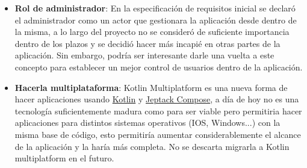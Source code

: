 \begin{itemize}
    \item \textbf{Rol de administrador}: En la especificación de requisitos inicial se declaró el administrador como un actor que gestionara la aplicación desde dentro de la misma, a lo largo del proyecto no se consideró de suficiente importancia dentro de los plazos y se decidió hacer más incapié en otras partes de la aplicación. Sin embargo, podría ser interesante darle una vuelta a este concepto para establecer un mejor control de usuarios dentro de la aplicación.
    \item \textbf{Hacerla multiplataforma}: Kotlin Multiplatform\hyperlink{cap:biblio}{} es una nueva forma de hacer aplicaciones usando \hyperlink{subsec:kotlin}{Kotlin} y \hyperlink{subsec:compose}{Jeptack Compose}, a día de hoy no es una tecnología suficientemente madura como para ser viable pero permitiria hacer aplicaciones para distintos sistemas operativos (IOS, Windows...) con la misma base de código, esto permitiría aumentar considerablemente el alcance de la aplicación y la haría más completa. No se descarta migrarla a Kotlin multiplatform en el futuro.
\end{itemize}


